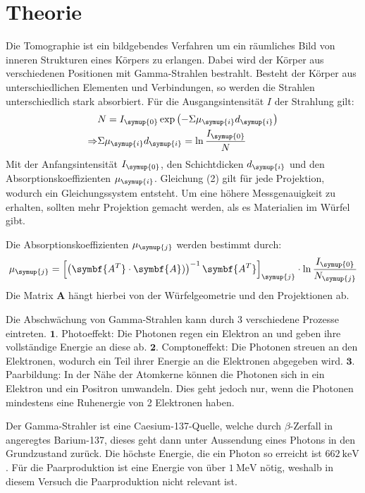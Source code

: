 \section{Theorie}
\label{sec:Theorie}

Die Tomographie ist ein bildgebendes Verfahren um ein räumliches Bild von inneren Strukturen
eines Körpers zu erlangen. Dabei wird der Körper aus verschiedenen Positionen mit
Gamma-Strahlen bestrahlt. Besteht der Körper aus unterschiedlichen Elementen und Verbindungen,
so werden die Strahlen unterschiedlich stark absorbiert. Für die Ausgangsintensität $I$
der Strahlung gilt:
\begin{align}
  &N=I_{\symup{0}} \exp{\left(-\Sigma \mu_{\symup{i}} d_{\symup{i}}\right)} \\
  \Rightarrow &\Sigma \mu_{\symup{i}} d_{\symup{i}} = \ln{\frac{I_{\symup{0}}}{N}}
  \label{eqn:mu}
\end{align}
Mit der Anfangsintensität $I_{\symup{0}}$, den Schichtdicken $d_{\symup{i}}$
und den Absorptionskoeffizienten $\mu_{\symup{i}}$.
Gleichung (2) gilt für jede Projektion, wodurch ein Gleichungssystem entsteht. Um eine höhere
Messgenauigkeit zu erhalten, sollten mehr Projektion gemacht werden, als es
Materialien im Würfel gibt.

Die Absorptionskoeffizienten $\mu_{\symup{j}}$ werden bestimmt durch:
\begin{align}
  \mu_{\symup{j}} = \left[\left(\symbf{A^T} \cdot \symbf{A})\right)^{-1} \symbf{A^T}\right]_{\symup{j}} \cdot \ln{\frac{I_{\symup{0}}}{N_{\symup{j}}}}
\end{align}
Die Matrix $\symbf{A}$ hängt hierbei von der Würfelgeometrie und den Projektionen ab.

Die Abschwächung von Gamma-Strahlen kann durch 3 verschiedene Prozesse eintreten.
$\symbf{1.}$ Photoeffekt: Die Photonen regen ein Elektron an und geben ihre vollständige Energie an diese ab.
$\symbf{2.}$ Comptoneffekt: Die Photonen streuen an den Elektronen, wodurch ein Teil ihrer Energie
an die Elektronen abgegeben wird.
$\symbf{3.}$ Paarbildung: In der Nähe der Atomkerne können die Photonen sich in ein Elektron und ein Positron
umwandeln. Dies geht jedoch nur, wenn die Photonen mindestens eine Ruhenergie von 2 Elektronen
haben.

Der Gamma-Strahler ist eine Caesium-137-Quelle, welche durch $\beta$-Zerfall in angeregtes Barium-137,
dieses geht dann unter Aussendung eines Photons in den Grundzustand zurück. Die höchste
Energie, die ein Photon so erreicht ist $\SI{662}{\kilo\eV}$. Für die Paarproduktion
ist eine Energie von über $\SI{1}{\mega\eV}$ nötig, weshalb in diesem Versuch die
Paarproduktion nicht relevant ist.
